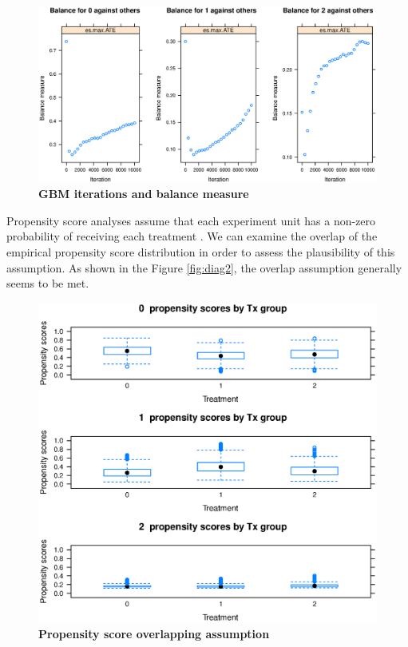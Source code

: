 \documentclass[12pt]{report}
\begin{document}
\begin{figure}[!htb]
\begin{center}
\includegraphics[width=\textwidth]{psdiag1.eps}
\caption{{\bf GBM iterations and balance measure}}
\label{fig.diag1}
\end{center}
\end{figure}

Propensity score analyses assume that each experiment unit has a non-zero probability of receiving each treatment \citep{mnps2015}. We can examine the overlap of the empirical propensity score distribution in order to assess the plausibility of this assumption. As shown in the Figure \ref{fig:diag2}, the overlap assumption generally seems to be met. 

\begin{figure}[!htb]
\begin{center}
\includegraphics[width=\textwidth]{psdiag2.eps}
\caption{{\bf Propensity score overlapping assumption}}
\label{fig.diag2}
\end{center}
\end{figure}
\end{document}
